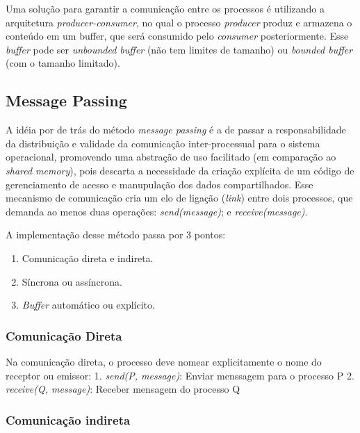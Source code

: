 Uma solução para garantir a comunicação entre os processos é utilizando
a arquitetura \emph{producer-consumer}, no qual o processo
\emph{producer} produz e armazena o conteúdo em um buffer, que será
consumido pelo \emph{consumer} posteriormente. Esse \emph{buffer} pode
ser \emph{unbounded buffer} (não tem limites de tamanho) ou
\emph{bounded buffer} (com o tamanho limitado).

\hypertarget{message-passing}{%
\subsection{Message Passing}\label{message-passing}}

A idéia por de trás do método \emph{message passing} é a de passar a
responsabilidade da distribuição e validade da comunicação
inter-processual para o sistema operacional, promovendo uma abstração de
uso facilitado (em comparação ao \emph{shared memory}), pois descarta a
necessidade da criação explícita de um código de gerenciamento de acesso
e manupulação dos dados compartilhados. Esse mecanismo de comunicação
cria um elo de ligação (\emph{link}) entre dois processos, que demanda
ao menos duas operações: \emph{send(message)}; e
\emph{receive(message)}.

A implementação desse método passa por 3 pontos:

\begin{enumerate}
\def\labelenumi{\arabic{enumi}.}
\tightlist
\item
  Comunicação direta e indireta.
\item
  Síncrona ou assíncrona.
\item
  \emph{Buffer} automático ou explícito.
\end{enumerate}

\hypertarget{comunicauxe7uxe3o-direta}{%
\subsubsection{Comunicação Direta}\label{comunicauxe7uxe3o-direta}}

Na comunicação direta, o processo deve nomear explicitamente o nome do
receptor ou emissor: 1. \emph{send(P, message)}: Enviar menssagem para o
processo P 2. \emph{receive(Q, message)}: Receber mensagem do processo Q

\hypertarget{comunicauxe7uxe3o-indireta}{%
\subsubsection{Comunicação indireta}\label{comunicauxe7uxe3o-indireta}}

